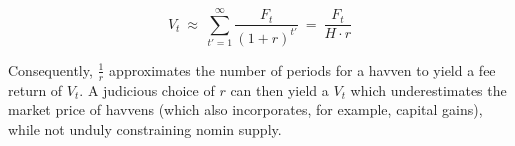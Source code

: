 \vspace{2mm}

\begin{equation}
    V_t \ \approx \ \sum_{t'=1}^{\infty} \frac{F_t}{(1 + r)^{t'}} \ = \ \frac{F_t}{H \cdot r}
\end{equation}

\vspace{3mm}

\noindent Consequently, $\frac{1}{r}$ approximates the number of periods for
a havven to yield a fee return of $V_t$. A judicious choice of $r$ can then
yield a $V_t$ which underestimates the market price of havvens (which also
incorporates, for example, capital gains), while not unduly constraining
nomin supply.
